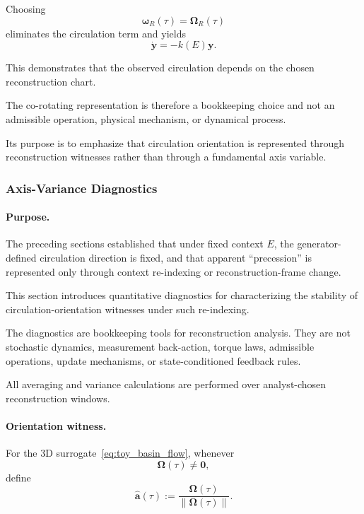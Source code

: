\documentclass[aps,prx,onecolumn,11pt]{revtex4-2}
\theoremstyle{plain}
\theoremstyle{definition}
\theoremstyle{remark}
\begin{document}
Choosing
\[
\boldsymbol{\omega}_R(\tau)
=
\boldsymbol{\Omega}_R(\tau)
\]
eliminates the circulation term and yields
\[
\dot{\mathbf y}
=
-k(E)\mathbf y.
\]

This demonstrates that the observed circulation depends on the chosen
reconstruction chart.

The co-rotating representation is therefore a bookkeeping choice and
not an admissible operation, physical mechanism, or dynamical process.

Its purpose is to emphasize that circulation orientation is represented
through reconstruction witnesses rather than through a fundamental axis
variable.

\subsubsection{Axis-Variance Diagnostics}
\label{toy:spin_proxy:variance_diag}

\paragraph{Purpose.}

The preceding sections established that under fixed context \(E\), the
generator-defined circulation direction is fixed, and that apparent
``precession'' is represented only through context re-indexing or
reconstruction-frame change.

This section introduces quantitative diagnostics for characterizing the
stability of circulation-orientation witnesses under such re-indexing.

The diagnostics are bookkeeping tools for reconstruction analysis. They
are not stochastic dynamics, measurement back-action, torque laws,
admissible operations, update mechanisms, or state-conditioned feedback
rules.

All averaging and variance calculations are performed over
analyst-chosen reconstruction windows.

\paragraph{Orientation witness.}

For the 3D surrogate~\eqref{eq:toy_basin_flow}, whenever
\[
\boldsymbol{\Omega}(\tau)\neq\mathbf 0,
\]
define
\begin{equation}
\widehat{\mathbf a}(\tau)
:=
\frac{
\boldsymbol{\Omega}(\tau)
}{
\|\boldsymbol{\Omega}(\tau)\|
}.
\label{eq:toy_axis_unit}
\end{equation}
\end{document}
